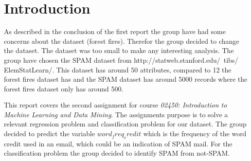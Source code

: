\section{Introduction}
\label{sec:intro}

As described in the conclusion of the first report the group have had some concerns about the dataset (forest fires). Therefor the group decided to change the dataset. The dataset was too small to make any interesting analysis. The group have chosen the SPAM dataset from http://statweb.stanford.edu/~tibs/ ElemStatLearn/. This dataset has around 50 attributes, compared to 12 the forest fires dataset has and the SPAM dataset has around 5000 records where the forest fires dataset only has around 500.


This report covers the second assignment for course \textit{02450: Introduction to Machine Learning and Data Mining}. The assignments purpose is to solve a relevant regression problem and classification problem for our dataset. The group decided to predict the variable $word_freq_credit$ which is the frequency of the word credit used in an email, which could be an indication of SPAM mail. For the classification problem the group decided to identify SPAM from not-SPAM.